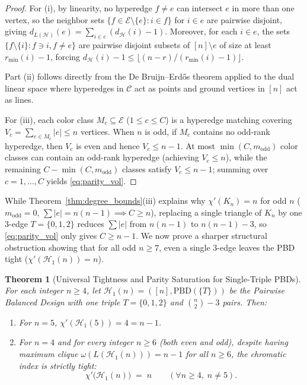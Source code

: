 \documentclass[11pt,reqno]{amsart}
\newtheorem{theorem}{Theorem}[section]
\theoremstyle{definition}
\theoremstyle{remark}
\begin{document}
\begin{proof}
For (i), by linearity, no hyperedge $f \ne e$ can intersect $e$ in more than one vertex, so the neighbor sets $\{f \in \mathcal{E} \setminus \{e\} : i \in f\}$ for $i \in e$ are pairwise disjoint, giving $d_{L(\mathcal{H})}(e) = \sum_{i \in e}(d_{\mathcal{H}}(i) - 1)$. Moreover, for each $i \in e$, the sets $\{f \setminus \{i\} : f \ni i, f \ne e\}$ are pairwise disjoint subsets of $[n] \setminus e$ of size at least $r_{\min}(i) - 1$, forcing $d_{\mathcal{H}}(i) - 1 \le \lfloor (n - r)/(r_{\min}(i) - 1) \rfloor$.

Part (ii) follows directly from the De Bruijn--Erd\H{o}s theorem \cite{DeBruijnErdos1948} applied to the dual linear space where hyperedges in $\mathcal{C}$ act as points and ground vertices in $[n]$ act as lines.

For (iii), each color class $M_c \subseteq \mathcal{E}$ ($1 \le c \le C$) is a hyperedge matching covering $V_c = \sum_{e \in M_c} |e| \le n$ vertices. When $n$ is odd, if $M_c$ contains no odd-rank hyperedge, then $V_c$ is even and hence $V_c \le n - 1$. At most $\min(C, m_{\mathrm{odd}})$ color classes can contain an odd-rank hyperedge (achieving $V_c \le n$), while the remaining $C - \min(C, m_{\mathrm{odd}})$ classes satisfy $V_c \le n - 1$; summing over $c = 1, \dots, C$ yields \eqref{eq:parity_vol}.
\end{proof}

While Theorem~\ref{thm:degree_bounds}(iii) explains why $\chi'(K_n) = n$ for odd $n$ ($m_{\mathrm{odd}} = 0$, $\sum |e| = n(n-1) \implies C \ge n$), replacing a single triangle of $K_n$ by one $3$-edge $T = \{0, 1, 2\}$ reduces $\sum |e|$ from $n(n-1)$ to $n(n-1) - 3$, so \eqref{eq:parity_vol} only gives $C \ge n - 1$. We now prove a sharper structural obstruction showing that for all odd $n \ge 7$, even a single $3$-edge leaves the PBD tight ($\chi'(\mathcal{H}_1(n)) = n$).

\begin{theorem}[Universal Tightness and Parity Saturation for Single-Triple PBDs]\label{thm:parity_saturation}
For each integer $n \ge 4$, let $\mathcal{H}_1(n) = ([n], \mathrm{PBD}(\{T\}))$ be the Pairwise Balanced Design with one triple $T = \{0, 1, 2\}$ and $\binom{n}{2} - 3$ pairs. Then:
\begin{enumerate}
  \item[\textup{(i)}] For $n = 5$, $\chi'(\mathcal{H}_1(5)) = 4 = n - 1$.
  \item[\textup{(ii)}] For $n = 4$ and for \emph{every integer $n \ge 6$ (both even and odd)}, despite having maximum clique $\omega(L(\mathcal{H}_1(n))) = n - 1$ for all $n \ge 6$, the chromatic index is strictly tight:
  \begin{equation}\label{eq:h1_tight}
    \chi'\bigl(\mathcal{H}_1(n)\bigr) \;=\; n \qquad (\forall n \ge 4,\; n \ne 5).
  \end{equation}
\end{enumerate}
\end{theorem}
\end{document}
